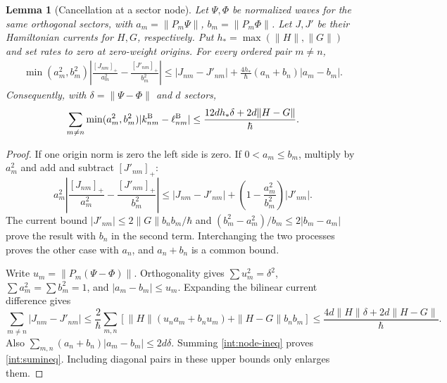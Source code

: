 \documentclass[11pt,oneside,openany]{book}
\newtheorem{lemma}[theorem]{Lemma}
\theoremstyle{definition}
\theoremstyle{remark}\newtheorem{remark}[theorem]{Remark}
\begin{document}
\begin{lemma}[Cancellation at a sector node]\label{int:node-cancellation}
Let $\Psi,\Phi$ be normalized waves for the same orthogonal sectors, with $a_m=\|P_m\Psi\|$, $b_m=\|P_m\Phi\|$. Let $J,J'$ be their Hamiltonian currents for $H,G$, respectively. Put $h_* = \max(\|H\|,\|G\|)$ and set rates to zero at zero-weight origins. For every ordered pair $m\ne n$,
\begin{align}\label{int:node-ineq}
 \min(a_m^2,b_m^2)
 \left|\frac{[J_{nm}]_+}{a_m^2}-\frac{[J'_{nm}]_+}{b_m^2}\right|
 \le |J_{nm}-J'_{nm}|+
 \frac{4h_*}{\hbar}(a_n+b_n)|a_m-b_m|.
\end{align}
Consequently, with $\delta=\|\Psi-\Phi\|$ and $d$ sectors,
\begin{equation}\label{int:sumineq}
 \sum_{m\ne n}\min(a_m^2,b_m^2)|k^{\rm B}_{nm}-\ell^{\rm B}_{nm}|
 \le\frac{12d h_*\delta+2d\|H-G\|}{\hbar}.
\end{equation}
\end{lemma}
\begin{proof}
If one origin norm is zero the left side is zero. If $0<a_m\le b_m$, multiply by $a_m^2$ and add and subtract $[J'_{nm}]_+$:
\[
 a_m^2\left|\frac{[J_{nm}]_+}{a_m^2}-\frac{[J'_{nm}]_+}{b_m^2}\right|
 \le |J_{nm}-J'_{nm}|+
 \left(1-\frac{a_m^2}{b_m^2}\right)|J'_{nm}|.
\]
The current bound $|J'_{nm}|\le2\|G\|b_nb_m/\hbar$ and
$(b_m^2-a_m^2)/b_m\le2|b_m-a_m|$ prove the result with $b_n$ in the second term. Interchanging the two processes proves the other case with $a_n$, and $a_n+b_n$ is a common bound.

Write $u_m=\|P_m(\Psi-\Phi)\|$. Orthogonality gives $\sum u_m^2=\delta^2$, $\sum a_m^2=\sum b_m^2=1$, and $|a_m-b_m|\le u_m$. Expanding the bilinear current difference gives
\[
 \sum_{m\ne n}|J_{nm}-J'_{nm}|
 \le \frac{2}{\hbar}\sum_{m,n}
 \left[\|H\|(u_na_m+b_nu_m)+\|H-G\|b_nb_m\right]
 \le\frac{4d\|H\|\delta+2d\|H-G\|}{\hbar}.
\]
Also $\sum_{m,n}(a_n+b_n)|a_m-b_m|\le2d\delta$. Summing \eqref{int:node-ineq} proves \eqref{int:sumineq}. Including diagonal pairs in these upper bounds only enlarges them.
\end{proof}
\end{document}
